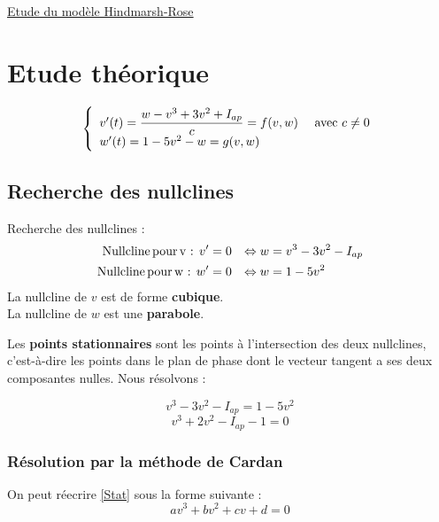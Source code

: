 \documentclass[12pt,a4paper,onecolumn]{article}
\begin{document}
\href{https://tel.archives-ouvertes.fr/tel-00453912v1/document}{Etude du  modèle Hindmarsh-Rose}


\newpage
\tableofcontents

\newpage

\section{Etude théorique}


\begin{equation}
\left\{
\begin{array}{l l}
v'(t)= \displaystyle{\frac{w - v^3 + 3v^2 +I_{ap}}{c}} = f(v,w) & \text{ avec } c\neq 0\\
w'(t) = 1 - 5 v^2 - w = g(v,w) & \\
\end{array}
\right.
\end{equation}

\subsection{Recherche des nullclines}

Recherche des nullclines :
\begin{align*}
\text{Nullcline\,pour\,v : } v' &= 0  &\Leftrightarrow w &= v^3 - 3 v^2 - I_{ap}\\
\text{Nullcline\,pour\,w : } w' &= 0 &\Leftrightarrow w &= 1-5v^2
\end{align*}
La nullcline de $v$ est de forme \textbf{cubique}. \\
La nullcline de $w$ est une \textbf{parabole}.

Les \textbf{points stationnaires} sont les points à l'intersection des deux nullclines, c'est-à-dire les points dans le plan de phase dont le vecteur tangent a ses deux composantes nulles. Nous résolvons :

$$
v^3 - 3 v^2 - I_{ap} = 1-5v^2
$$
\begin{equation} \label{Stat}
v^3 + 2v^2 -I_{ap} -1 = 0
\end{equation}



\subsubsection{Résolution par la méthode de Cardan}
On peut réecrire \ref{Stat} sous la forme suivante :
\begin{equation*}
av^3 + b v^2 + cv + d = 0
\end{equation*}
\end{document}
